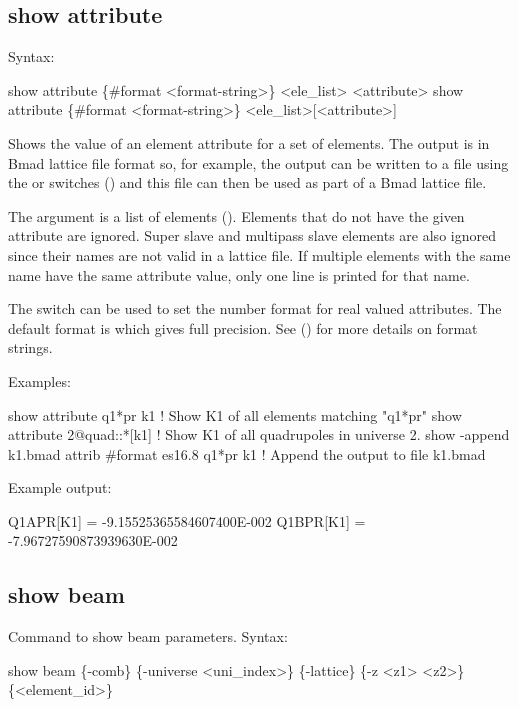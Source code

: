 {{{{{{{{{\subsection{show attribute}
\label{s:show.attribute}

Syntax:
\begin{example}
  show attribute \{#format <format-string>\} <ele_list> <attribute>
  show attribute \{#format <format-string>\} <ele_list>[<attribute>]
\end{example}

Shows the value of an element attribute for a set of elements. The output is in Bmad lattice file
format so, for example, the output can be written to a file using the  or
 switches () and this file can then be used as part of a Bmad lattice file.

The  argument is a list of elements (). Elements
that do not have the given attribute are ignored. Super slave and multipass slave elements are
also ignored since their names are not valid in a lattice file. If multiple elements with the same
name have the same attribute value, only one line is printed for that name.

The  switch can be used to set the number format for real valued attributes. The
default format is  which gives full precision. See 
() for more details on format strings.

Examples:
\begin{example}
  show attribute q1*pr k1         ! Show K1 of all elements matching "q1*pr"
  show attribute 2@quad::*[k1]    ! Show K1 of all quadrupoles in universe 2.
  show -append k1.bmad attrib #format es16.8 q1*pr k1  ! Append the output to file k1.bmad
\end{example}
Example output:
\begin{example}
  Q1APR[K1] = -9.15525365584607400E-002
  Q1BPR[K1] = -7.96727590873939630E-002
\end{example}


\subsection{show beam}
\label{s:show.beam}

Command to show beam parameters. Syntax:
\begin{example}
  show beam \{-comb\} \{-universe <uni_index>\} \{-lattice\} \{-z <z1> <z2>\} \{<element_id>\}
\end{example}

}}}}}}}}}
